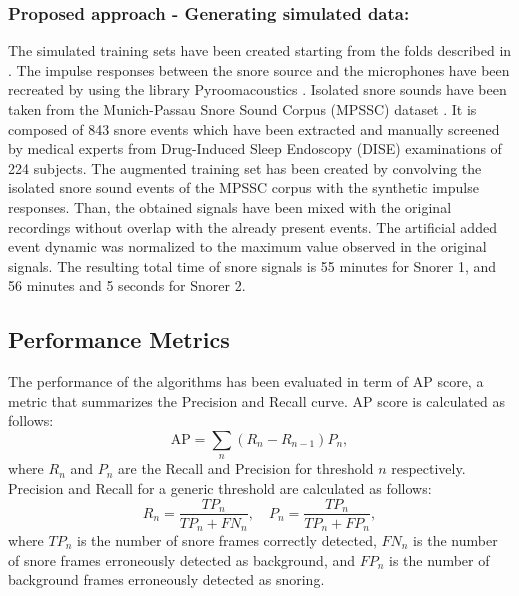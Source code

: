 \subsubsection{Proposed approach - Generating simulated data:} The simulated training sets have been created starting from the folds described in .
The impulse responses between the snore source and the microphones have been recreated by using the library Pyroomacoustics \cite{Scheibler2018}.
Isolated snore sounds have been taken from the Munich-Passau Snore Sound Corpus (MPSSC) dataset \cite{ComParE2017}. It is composed of 843 snore events which have been extracted and manually screened by medical experts from Drug-Induced Sleep Endoscopy (DISE) examinations of 224 subjects.
The augmented training set has been created by convolving the isolated snore sound events of the MPSSC corpus with the synthetic impulse responses. Than, the obtained signals have been mixed with the original recordings without overlap with the already present events. The artificial added event dynamic was normalized to the maximum value observed in the original signals. The resulting total time of snore signals is 55 minutes for Snorer 1, and 56 minutes and 5 seconds for Snorer 2.

\subsection{Performance Metrics}

The performance of the algorithms has been evaluated in term of AP score, a metric that summarizes the Precision and Recall curve. AP score is calculated as follows:
\begin{equation}
\text{AP} = \sum_n (R_n-R_{n-1})P_n,
\end{equation}
where $R_n$ and $P_n$ are the Recall and Precision for threshold $n$ respectively. Precision and Recall for a generic threshold are calculated as follows:
\begin{equation}
R_n = \frac{TP_n}{TP_n+FN_n}, \quad P_n = \frac{TP_n}{TP_n+FP_n},
\end{equation}
where $TP_n$ is the number of snore frames correctly detected, $FN_n$ is the number of snore frames erroneously detected as background, and $FP_n$ is the number of background frames erroneously detected as snoring.

